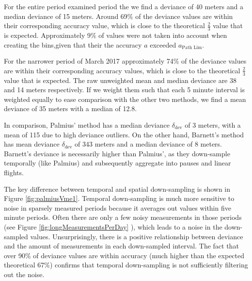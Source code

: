 \documentclass[man]{apa6}
\theoremstyle{definition}
\theoremstyle{definition}
\theoremstyle{definition}
\theoremstyle{remark}
\begin{document}
For the entire period examined period the we find a deviance of 40
meters and a median deviance of 15 meters. Around 69\% of the deviance
values are within their corresponding accuracy value, which is close to
the theoretical \(\frac{2}{3}\) value that is expected. Approximately
9\% of values were not taken into account when creating the bins,given
that their the accuracy \(a\) exceeded \(a_{\text{Path Lim}}\).

For the narrower period of March 2017 approximately 74\% of the deviance
values are within their corresponding accuracy values, which is close to
the theoretical \(\frac{2}{3}\) value that is expected. The raw
unweighted mean and median deviance are 38 and 14 meters respectively.
If we weight them such that each 5 minute interval is weighted equally
to ease comparison with the other two methods, we find a mean deviance
of 35 meters with a median of 12.8.

In comparison, Palmius' method has a median deviance
\(\delta_{\text{dev}}\) of 3 meters, with a mean of 115 due to high
deviance outliers. On the other hand, Barnett's method has mean deviance
\(\delta_{\text{dev}}\) of 343 meters and a median deviance of 8 meters.
Barnett's deviance is necessarily higher than Palmius', as they
down-sample temporally (like Palmius) and subsequently aggregate into
pauses and linear flights.

The key difference between temporal and spatial down-sampling is shown
in Figure \ref{fig:palmiusVme1}. Temporal down-sampling is much more
sensitive to noise in sparsely measured periods because it averages out
values within five minute periods. Often there are only a few noisy
measurements in those periods (see Figure
\ref{fig:longMeasurementsPerDay} ), which leads to a noise in the
down-sampled values. Unsurprisingly, there is a positive relationship
between deviance and the amount of measurements in each down-sampled
interval. The fact that over 90\% of deviance values are within accuracy
(much higher than the expected theoretical 67\%) confirms that temporal
down-sampling is not sufficiently filtering out the noise.
\end{document}
